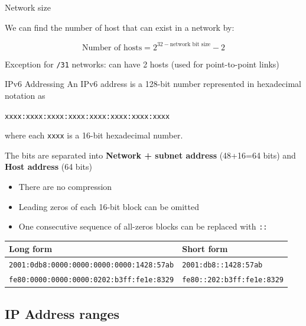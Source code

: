 \begin{theorem}
    {Network size}

    We can find the number of host that can exist in a network by:

    \[
        \text{Number of hosts} = 2^{32-\text{network bit size}} - 2
    \]

    Exception for \texttt{/31} networks: can have 2 hosts (used for point-to-point links)
\end{theorem}

\begin{definition}
    {IPv6 Addressing}
    An IPv6 address is a 128-bit number represented in hexadecimal notation as

    \texttt{xxxx:xxxx:xxxx:xxxx:xxxx:xxxx:xxxx:xxxx}

    where each \texttt{xxxx} is a 16-bit hexadecimal number.

    The bits are separated into \textbf{Network + subnet address} (48+16=64 bits) and \textbf{Host address} (64 bits)

    \begin{itemize}
        \item There are no compression
        \item Leading zeros of each 16-bit block can be omitted
        \item One consecutive sequence of all-zeros blocks can be replaced with \texttt{::}
    \end{itemize}

    \tcblower

    \begin{tabular}{l|l}
        \textbf{Long form}                               & \textbf{Short form}               \\
        \hline
        \texttt{2001:0db8:0000:0000:0000:0000:1428:57ab} & \texttt{2001:db8::1428:57ab}      \\
        \texttt{fe80:0000:0000:0000:0202:b3ff:fe1e:8329} & \texttt{fe80::202:b3ff:fe1e:8329} \\
    \end{tabular}
\end{definition}


\subsection{IP Address ranges}

